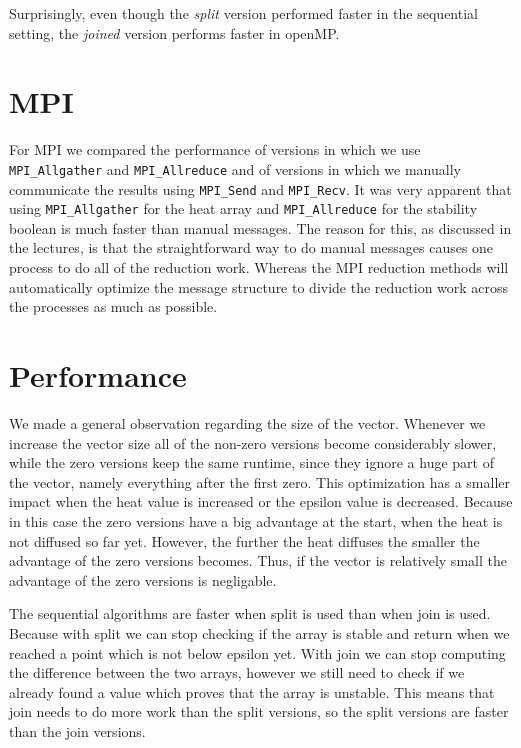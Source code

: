 \documentclass[a4paper]{article}
\begin{document}

Surprisingly, even though the \textit{split} version performed faster in the sequential setting, the \textit{joined} version performs faster in openMP.

\section{MPI}
For MPI we compared the performance of versions in which we use \texttt{MPI\_Allgather}
and \texttt{MPI\_Allreduce} and of versions in which we manually communicate the results using \texttt{MPI\_Send} and \texttt{MPI\_Recv}. It was very apparent that using \texttt{MPI\_Allgather} for the heat array and \texttt{MPI\_Allreduce} for the stability boolean is much faster than manual messages. The reason for this, as discussed in the lectures,
is that the straightforward way to do manual messages causes one process to do all of the reduction work. Whereas the MPI reduction methods will automatically optimize the message structure to divide the reduction work across the processes as much as possible.


\section{Performance}
We made a general observation regarding the size of the vector. Whenever we increase the vector size all of the non-zero versions become considerably slower, while the zero versions keep the same runtime, since they ignore a huge part of the vector, namely everything after the first zero. This optimization has a smaller impact when the heat value is increased or the epsilon value is decreased. Because in this case the zero versions have a big advantage at the start, when the heat is not diffused so far yet. However, the further the heat diffuses the smaller the advantage of the zero versions becomes. Thus, if the vector is relatively small the advantage of the zero versions is negligable.

The sequential algorithms are faster when split is used than when join is used. Because with split we can stop checking if the array is stable and return when we reached a point which is not below epsilon yet. With join we can stop computing the difference between the two arrays, however we still need to check if we already found a value which proves that the array is unstable. This means that join needs to do more work than the split versions, so the split versions are faster than the join versions.
\end{document}
